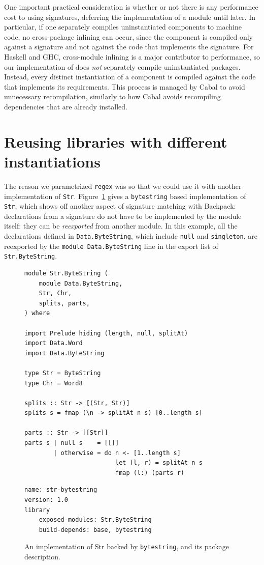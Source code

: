 One important practical consideration is whether or not there is any
performance cost to using signatures, deferring the implementation of
a module until later.  In particular, if one separately
compiles uninstantiated components to machine code, no cross-package
inlining can occur, since the component is compiled only against a
signature and not against the code that implements the signature.  For
Haskell and GHC, cross-module inlining is a major contributor to
performance, so our implementation of \Backpack{} does \emph{not}
separately compile uninstantiated packages. Instead, every distinct
instantiation of a component is compiled against the code that
implements its requirements. This process is managed by Cabal to avoid
unnecessary recompilation, similarly to how Cabal avoids recompiling
dependencies that are already installed.

\section{Reusing libraries with different instantiations}

The reason we parametrized \verb|regex| was so that we could use it
with another implementation of \verb|Str|.  Figure~\ref{fig:str-bytestring}
gives a \verb|bytestring| based implementation of \verb|Str|, which shows
off another aspect of signature matching with Backpack: declarations from
a signature do not have to be implemented by the module itself: they can
be \emph{reexported} from another module.  In this example, all the declarations
defined in \verb|Data.ByteString|, which include \verb|null| and \verb|singleton|,
are reexported by the \verb|module Data.ByteString| line in the export list
of \verb|Str.ByteString|.

\begin{figure}
\begin{lstlisting}
module Str.ByteString (
    module Data.ByteString,
    Str, Chr,
    splits, parts,
) where

import Prelude hiding (length, null, splitAt)
import Data.Word
import Data.ByteString

type Str = ByteString
type Chr = Word8

splits :: Str -> [(Str, Str)]
splits s = fmap (\n -> splitAt n s) [0..length s]

parts :: Str -> [[Str]]
parts s | null s    = [[]]
        | otherwise = do n <- [1..length s]
                         let (l, r) = splitAt n s
                         fmap (l:) (parts r)
\end{lstlisting}
\begin{lstlisting}[language=Cabal]
name: str-bytestring
version: 1.0
library
    exposed-modules: Str.ByteString
    build-depends: base, bytestring
\end{lstlisting}
\caption{An implementation of Str backed by \texttt{bytestring},
and its package description.}
\label{fig:str-bytestring}
\end{figure}

